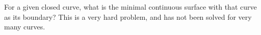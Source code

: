  For a given closed curve, what is the minimal continuous 
surface with that curve as its boundary? This is a very hard problem,
and has not been solved for very many curves.
